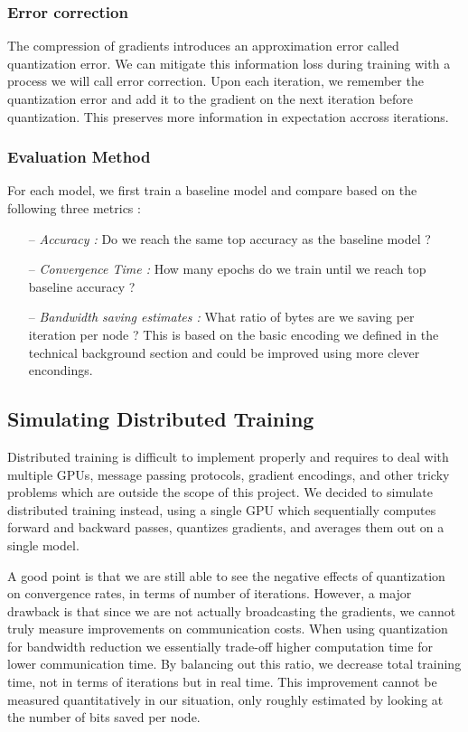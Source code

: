 \documentclass[10pt,conference,compsocconf]{IEEEtran}
\begin{document}
\subsubsection{Error correction}

The compression of gradients introduces an approximation error called quantization error. We can mitigate this information loss during training with a process we will call error correction. Upon each iteration, we remember the quantization error and add it to the gradient on the next iteration before quantization. This preserves more information in expectation accross iterations.

\subsubsection{Evaluation Method}

For each model, we first train a baseline model and compare based on the following three metrics :

\begin{itemize}
	\item[--] \textit{Accuracy :} Do we reach the same top accuracy as the baseline model ?
	\item[--] \textit{Convergence Time :} How many epochs do we train until we reach top baseline accuracy ?
	\item[--] \textit{Bandwidth saving estimates :} What ratio of bytes are we saving per iteration per node ? This is based on the basic encoding we defined in the technical background section and could be improved using more clever encondings.
\end{itemize}

\subsection{Simulating Distributed Training}

Distributed training is difficult to implement properly and requires to deal with multiple GPUs, message passing protocols, gradient encodings, and other tricky problems which are outside the scope of this project. We decided to simulate distributed training instead, using a single GPU which sequentially computes forward and backward passes, quantizes gradients, and averages them out on a single model. 

A good point is that we are still able to see the negative effects of quantization on convergence rates, in terms of number of iterations. However, a major drawback is that since we are not actually broadcasting the gradients, we cannot truly measure improvements on communication costs. When using quantization for bandwidth reduction we essentially trade-off higher computation time for lower communication time. By balancing out this ratio, we decrease total training time, not in terms of iterations but in real time. This improvement cannot be measured quantitatively in our situation, only roughly estimated by looking at the number of bits saved per node.
\end{document}
